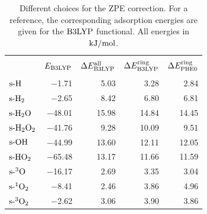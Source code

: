 \begin{table}[t!]
  \caption{Different choices for the ZPE correction. For a reference, the corresponding 
  adsorption energies are given for the $\text{B3LYP}$ functional. All energies in $\text {kJ/mol}$.}
  \centering
    \begin{tabular}{l|rrrr}
       & & & & \\[-10pt]
     & $E_{\text{B3LYP}}$   & $\Delta E^{\text{all}}_{\text{B3LYP}}$ & $\Delta E^{\text{ring}}_{\text{B3LYP}}$ & $\Delta E^{\text{ring}}_{\text{PBE0}}$ \\[2pt]
    \hline
       & & & & \\[-10pt]
    $\text{s-}\text{H}$ & $-$1.71 & 5.03  & 3.28  & 2.84 \\
    $\text{s-}\text H_2$ & $-$2.65 & 8.42  & 6.80  & 6.81 \\
    $\text{s-}\text H _2 \text O$ & $-$48.01 & 15.98 & 14.84 & 14.45 \\
    $\text{s-}\text H _2 \text O_2$ & $-$41.76 & 9.28  & 10.09 & 9.51 \\
    $\text{s-}\text O \text H$ & $-$44.99 & 13.60 & 12.11 & 12.05 \\
    $\text{s-}\text H \text O_2$ & $-$65.48 & 13.17 & 11.66 & 11.59 \\
    $\text{s-}{^3\text{O}}$ & $-$16.17 & 2.69  & 3.35  & 3.04 \\
    $\text{s-}{^1\ensuremath{\text O_2}}$ & $-$8.41 & 2.46  & 3.86  & 4.96 \\
    $\text{s-}{^3\ensuremath{\text O_2}}$ & $-$2.62 & 3.06  & 3.90  & 3.86 \\[2pt]
    \hline
    \end{tabular}%
  \label{Tab:Ads:AdsB3lyp}%
\end{table}%

